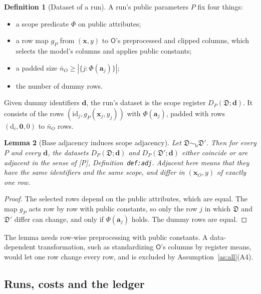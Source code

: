 \documentclass[11pt]{article}
\theoremstyle{definition}
\newtheorem{definition}{Definition}[section]
\theoremstyle{plain}
\newtheorem{lemma}[definition]{Lemma}
\newcommand{\Op}{\mathsf{O}}
\newcommand{\bx}{\mathbf{x}}
\newcommand{\bD}{\mathfrak D}
\newcommand{\simb}{\sim_{\mathrm b}}
\newcommand{\Pp}{\textup{[P]}}
\begin{document}
\begin{definition}[Dataset of a run]\label{def:rundata}
A run's public parameters $P$ fix four things:
\begin{itemize}[nosep]
  \item a scope predicate $\Phi$ on public attributes;
  \item a row map $g_P$ from $(\bx,y)$ to $\Op$'s preprocessed and clipped columns, which selects the model's columns and applies public constants;
  \item a padded size $\bar n_O\ge|\{j:\Phi(\mathbf a_j)\}|$;
  \item the number of dummy rows.
\end{itemize}
Given dummy identifiers $\mathbf d$, the run's dataset is the scope register $D_P(\bD;\mathbf d)$. It consists of the rows $(\mathrm{id}_j,g_P(\bx_j,y_j))$ with $\Phi(\mathbf a_j)$, padded with rows $(\mathrm d_i,\mathbf 0,0)$ to $\bar n_O$ rows.
\end{definition}

\begin{lemma}[Base adjacency induces scope adjacency]\label{lem:scopeadj}
Let $\bD\simb\bD'$. Then for every $P$ and every $\mathbf d$, the datasets $D_P(\bD;\mathbf d)$ and $D_P(\bD';\mathbf d)$ either coincide or are adjacent in the sense of \Pp, Definition~\texttt{def:adj}. Adjacent here means that they have the same identifiers and the same scope, and differ in $(\bx_O,y)$ of exactly one row.
\end{lemma}
\begin{proof}
The selected rows depend on the public attributes, which are equal. The map $g_P$ acts row by row with public constants, so only the row $j$ in which $\bD$ and $\bD'$ differ can change, and only if $\Phi(\mathbf a_j)$ holds. The dummy rows are equal.
\end{proof}

The lemma needs row-wise preprocessing with public constants. A data-dependent transformation, such as standardizing $\Op$'s columns by register means, would let one row change every row, and is excluded by Assumption~\ref{as:all}(A4).

\subsection{Runs, costs and the ledger}
\end{document}
